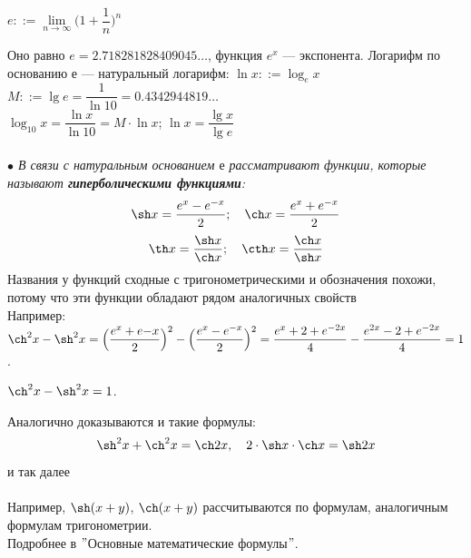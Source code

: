 \begin{center}
	$e ::= \lim\limits_{n\to\infty} \Big(1 + \dfrac{1}{n}\Big)^n$
\end{center}
Оно равно $e = 2.718281828409045\dots$, функция $e^x$ --- экспонента. Логарифм по основанию $е$ --- натуральный логарифм: $\ln x ::= \log_e x $\\
$M::=\lg e = \dfrac{1}{\ln10} = 0.4342944819\dots$\\
$\log_{10} x = \dfrac{\ln x}{\ln10} = M\cdot \ln x$;\quad
$\ln x = \dfrac{\lg x}{\lg e}$\\
\\\textit{
	$\bullet$ В связи с натуральным основанием $е$ рассматривают функции, которые называют \textbf{гиперболическими функциями}:}\\
$$ \sh x = \dfrac{e^x - e^{-x}}{2};\quad \ch x = \dfrac{e^x + e^{-x}}{2}$$
$$\th x = \dfrac{\sh x}{\ch x};\quad \cth x = \dfrac{\ch x}{\sh x}$$
Названия у функций сходные с тригонометрическими и обозначения похожи, потому что эти функции обладают рядом аналогичных свойств\\
Например: $\ch^2 x - \sh^2 x = \Big(\dfrac{e^x + e{-x} }{2}\Big)^2 - \Big(\dfrac{e^x - e^{-x} }{2}\Big)^2 = \dfrac{e^x + 2 + e^{-2x}}{4} - \dfrac{e^{2x} - 2 + e^{-2x}}{4} = 1$.
\begin{center}
	$\ch^2 x - \sh^2 x = 1$.
\end{center}
Аналогично доказываются и такие формулы:
$$ \sh^2x + \ch^2x = \ch2x,\quad2\cdot \sh x \cdot \ch x = \sh2x$$ и так далее\\\\
Например, $\sh(x + y)$, $\ch(x + y)$ рассчитываются по формулам, аналогичным формулам тригонометрии.\\
Подробнее в $"$Основные математические формулы$"$.
